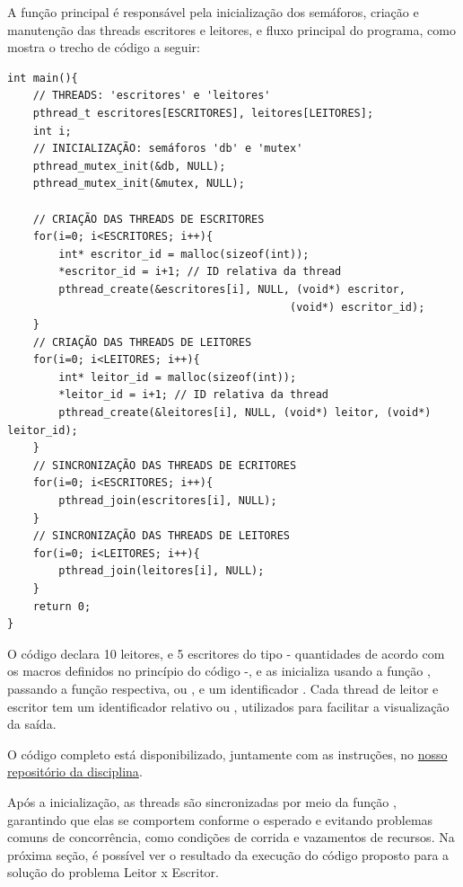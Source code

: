 \documentclass[
	12pt,				%
	openright,			%
	oneside,			%
	a4paper,			%
	chapter=TITLE,		%
	english,			%
	french,				%
	spanish,			%
	brazil				%
	]{abntex2}
\theoremstyle{definition}
\begin{document}
A função principal  é responsável pela inicialização dos semáforos, criação e manutenção das threads escritores e leitores, e fluxo principal do programa, como mostra o trecho de código a seguir:

\begin{verbatim}
int main(){
    // THREADS: 'escritores' e 'leitores'
    pthread_t escritores[ESCRITORES], leitores[LEITORES];
    int i;
    // INICIALIZAÇÃO: semáforos 'db' e 'mutex'
    pthread_mutex_init(&db, NULL);
    pthread_mutex_init(&mutex, NULL);

    // CRIAÇÃO DAS THREADS DE ESCRITORES
    for(i=0; i<ESCRITORES; i++){
        int* escritor_id = malloc(sizeof(int));
        *escritor_id = i+1; // ID relativa da thread 
        pthread_create(&escritores[i], NULL, (void*) escritor, 
                                            (void*) escritor_id);
    }
    // CRIAÇÃO DAS THREADS DE LEITORES
    for(i=0; i<LEITORES; i++){
        int* leitor_id = malloc(sizeof(int));
        *leitor_id = i+1; // ID relativa da thread
        pthread_create(&leitores[i], NULL, (void*) leitor, (void*) leitor_id);
    }
    // SINCRONIZAÇÃO DAS THREADS DE ECRITORES
    for(i=0; i<ESCRITORES; i++){
        pthread_join(escritores[i], NULL);
    }
    // SINCRONIZAÇÃO DAS THREADS DE LEITORES
    for(i=0; i<LEITORES; i++){
        pthread_join(leitores[i], NULL);
    }
    return 0;
}
\end{verbatim}

O código declara 10 leitores,  e 5 escritores  do tipo  - quantidades de acordo com os macros definidos no princípio do código -, e as inicializa usando a função , passando a função respectiva,  ou , e um identificador . Cada thread de leitor e escritor tem um identificador relativo  ou , utilizados para facilitar a visualização da saída. 

O código completo está disponibilizado, juntamente com as instruções, no \href{https://github.com/jvictorferreira3301/Sistemas_Operacionais}{nosso repositório da disciplina}.

Após a inicialização, as threads são sincronizadas por meio da função , garantindo que elas se comportem conforme o esperado e evitando problemas comuns de concorrência, como condições de corrida e vazamentos de recursos. Na próxima seção, é possível ver o resultado da execução do código proposto para a solução do problema Leitor x Escritor.
\end{document}
